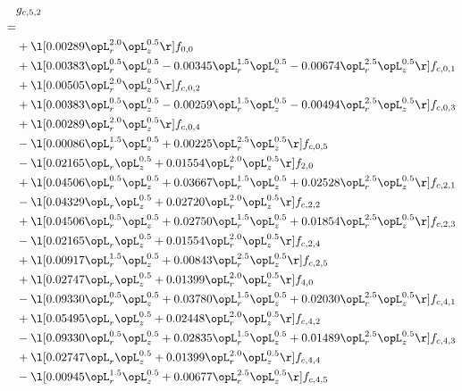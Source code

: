 \begin{alignat}{2} 
\label{eq:g_52_0} 
& g_{c,5,2} \nonumber \\ 
 = \\ 
& + \l[  0.00289 \opL_r^{2.0} \opL_z^{0.5}  \r] f_{0,0} \nonumber \\ 
& + \l[  0.00383 \opL_r^{0.5} \opL_z^{0.5}   -0.00345 \opL_r^{1.5} \opL_z^{0.5}   -0.00674 \opL_r^{2.5} \opL_z^{0.5}  \r] f_{c,0,1} \nonumber \\ 
& + \l[  0.00505 \opL_r^{2.0} \opL_z^{0.5}  \r] f_{c,0,2} \nonumber \\ 
& + \l[  0.00383 \opL_r^{0.5} \opL_z^{0.5}   -0.00259 \opL_r^{1.5} \opL_z^{0.5}   -0.00494 \opL_r^{2.5} \opL_z^{0.5}  \r] f_{c,0,3} \nonumber \\ 
& + \l[  0.00289 \opL_r^{2.0} \opL_z^{0.5}  \r] f_{c,0,4} \nonumber \\ 
& - \l[  0.00086 \opL_r^{1.5} \opL_z^{0.5} +  0.00225 \opL_r^{2.5} \opL_z^{0.5}  \r] f_{c,0,5} \nonumber \\ 
& - \l[  0.02165 \opL_r \opL_z^{0.5} +  0.01554 \opL_r^{2.0} \opL_z^{0.5}  \r] f_{2,0} \nonumber \\ 
& + \l[  0.04506 \opL_r^{0.5} \opL_z^{0.5} +  0.03667 \opL_r^{1.5} \opL_z^{0.5} +  0.02528 \opL_r^{2.5} \opL_z^{0.5}  \r] f_{c,2,1} \nonumber \\ 
& - \l[  0.04329 \opL_r \opL_z^{0.5} +  0.02720 \opL_r^{2.0} \opL_z^{0.5}  \r] f_{c,2,2} \nonumber \\ 
& + \l[  0.04506 \opL_r^{0.5} \opL_z^{0.5} +  0.02750 \opL_r^{1.5} \opL_z^{0.5} +  0.01854 \opL_r^{2.5} \opL_z^{0.5}  \r] f_{c,2,3} \nonumber \\ 
& - \l[  0.02165 \opL_r \opL_z^{0.5} +  0.01554 \opL_r^{2.0} \opL_z^{0.5}  \r] f_{c,2,4} \nonumber \\ 
& + \l[  0.00917 \opL_r^{1.5} \opL_z^{0.5} +  0.00843 \opL_r^{2.5} \opL_z^{0.5}  \r] f_{c,2,5} \nonumber \\ 
& + \l[  0.02747 \opL_r \opL_z^{0.5} +  0.01399 \opL_r^{2.0} \opL_z^{0.5}  \r] f_{4,0} \nonumber \\ 
& - \l[  0.09330 \opL_r^{0.5} \opL_z^{0.5} +  0.03780 \opL_r^{1.5} \opL_z^{0.5} +  0.02030 \opL_r^{2.5} \opL_z^{0.5}  \r] f_{c,4,1} \nonumber \\ 
& + \l[  0.05495 \opL_r \opL_z^{0.5} +  0.02448 \opL_r^{2.0} \opL_z^{0.5}  \r] f_{c,4,2} \nonumber \\ 
& - \l[  0.09330 \opL_r^{0.5} \opL_z^{0.5} +  0.02835 \opL_r^{1.5} \opL_z^{0.5} +  0.01489 \opL_r^{2.5} \opL_z^{0.5}  \r] f_{c,4,3} \nonumber \\ 
& + \l[  0.02747 \opL_r \opL_z^{0.5} +  0.01399 \opL_r^{2.0} \opL_z^{0.5}  \r] f_{c,4,4} \nonumber \\ 
& - \l[  0.00945 \opL_r^{1.5} \opL_z^{0.5} +  0.00677 \opL_r^{2.5} \opL_z^{0.5}  \r] f_{c,4,5} \nonumber \\ 
\end{alignat} 


